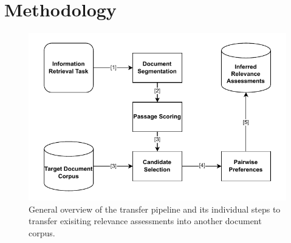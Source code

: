 \chapter{Methodology}\label{methodology}

\begin{figure}[t]
    \centering
    \includegraphics[width=\textwidth]{./graphics/drawio/transfer_pipeline.pdf}
    \caption{General overview of the transfer pipeline and its individual steps to transfer exisiting relevance assessments into another document corpus.}
    \label{fig:transfer-pipeline}
\end{figure}


